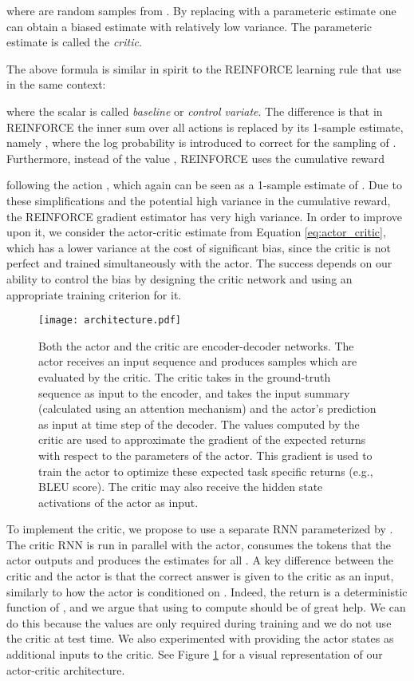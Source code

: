 \documentclass{article} \usepackage{iclr2017_conference,times}
\begin{document}
where  are  random samples from . By replacing 
with a parameteric estimate  one can obtain a biased estimate with
relatively low variance. The parameteric estimate  is
called the \textit{critic}.

The above formula is similar in spirit to the REINFORCE learning rule that \citet{ranzato2015sequence} use in the same context:

where the scalar  is called \textit{baseline} or \textit{control variate}.
The difference is that in REINFORCE the inner
sum over all actions is replaced by its 1-sample estimate, namely
, where the log probability 
 is introduced
to correct for the sampling of .
Furthermore, instead of the value , REINFORCE uses
the cumulative reward  

following the action , which again can be seen as a 1-sample estimate of .
Due to these simplifications and the potential high variance in the cumulative reward, the REINFORCE
gradient estimator has very high variance. In order to improve upon it, we
consider the actor-critic estimate from Equation \ref{eq:actor_critic}, which has a lower variance 
at the cost of significant bias, since the critic is not perfect and trained simultaneously
with the actor. The success depends on our ability to control the bias
by designing the critic network and using an appropriate training criterion for it.

\begin{figure}
    \centering
    \texttt{[image: architecture.pdf]}
    \caption{Both the actor and the critic are encoder-decoder networks. The actor receives an input sequence  and produces samples
         which are evaluated by the critic. The critic takes in the ground-truth 
        sequence  as input to the encoder, 
        and takes the input summary (calculated using an attention mechanism) and the 
        actor's prediction  as input at time step  of the decoder.  
    The values  computed by the critic are used to approximate the gradient of the
    expected returns with respect to the parameters of the actor. This gradient
    is used to train the actor to optimize these expected task specific returns
    (e.g., BLEU score). The critic may also receive the hidden state activations of the actor as input.}
\label{fig:arch}
\end{figure}

To implement the critic, we propose to use a separate RNN parameterized by .
The critic RNN is run
 in parallel with the actor, consumes the tokens 
that the actor outputs and
 produces the estimates  for all . 
 A key difference between the critic
and the actor is that the
 correct answer  is given to the critic as an
input, similarly to how the actor
 is conditioned on . Indeed, the return
 is a deterministic
 function of , and we argue that using
 to compute  should be of
 great help.  We can do this because the
values are only required during training and we do not use the critic at test
time.  We also experimented with providing the actor states  as additional
 inputs to the critic.
 See Figure \ref{fig:arch} for a visual
representation of our actor-critic architecture.
\end{document}
